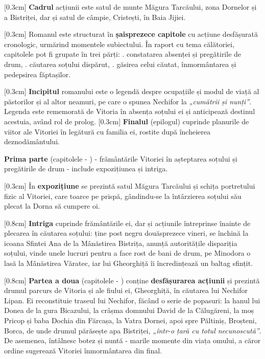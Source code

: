 \documentclass[
12pt,
a4paper
]{article}
\newcommand{\rom}[1]{\uppercase\expandafter{\romannumeral #1\relax}} %
\begin{document}
[0.3cm]
\textbf{Cadrul} acțiunii este satul de munte Măgura Tarcăului, zona Dornelor și a Bistriței, dar și satul de câmpie, Cristești, în Baia Jijiei.

[0.3cm]
Romanul este structurat în \textbf{șaisprezece capitole} cu acțiune desfășurată cronologic, urmărind momentele subiectului. În raport cu tema călătoriei, capitolele pot fi grupate în trei părți: \rom{1}. constatarea absenței și pregătirile de drum, \rom{2}. căutarea soțului dispărut, \rom{3}. găsirea celui căutat, înmormântarea și pedepsirea făptașilor.

[0.3cm]
\textbf{Incipitul} romanului este o legendă despre ocupațiile și modul de viață al păstorilor și al altor neamuri, pe care o spunea Nechifor la \textit{„cumătrii și nunți”}. Legenda este rememorată de Vitoria în absența soțului ei și anticipează destinul acestuia, având rol de prolog.
[0.3cm]
\textbf{Finalul} (epilogul) cuprinde planurile de viitor ale Vitoriei în legătură cu familia ei, rostite după încheierea deznodământului.

\textbf{Prima parte} (capitolele \rom{1} - \rom{6}) - frământările Vitoriei în așteptarea soțului și pregătirile de drum - include expozițiunea și intriga.

[0.3cm]
În \textbf{expozițiune} se prezintă satul Măgura Tarcăului și schița portretului fizic al Vitoriei, care toarce pe prispă, gândindu-se la întârzierea soțului său plecat la Dorna să cumpere oi.

[0.8cm]
\textbf{Intriga} cuprinde frământările ei, dar și acțiunile întreprinse înainte de plecarea în căutarea soțului: ține post negru douăsprezece vineri, se închină la icoana Sfintei Ana de la Mânăstirea Bistrița, anunță autoritățile dispariția soțului, vinde unele lucruri pentru a face rost de bani de drum, pe Minodora o lasă la Mânăstirea Văratec, iar lui Gheorghiță îi încredințează un baltag sfințit.

[0.8cm]
\textbf{Partea a doua} (capitolele \rom{7} - \rom{13}) conține \textbf{desfășurarea acțiunii} și prezintă drumul parcurs de Vitoria și ale fiului ei, Gheorghiță, în căutarea lui Nechifor Lipan. Ei reconstituie traseul lui Nechifor, făcând o serie de popasuri: la hanul lui Donea de la gura Bicazului, la crâșma domnului David de la Călugăreni, la moș Pricop și baba Dochia din Fărcașa, la Vatra Dornei, apoi spre Păltiniș, Broșteni, Borca, de unde drumul părăsește apa Bistriței, \textit{„într-o țară cu totul necunoscută”}. De asemenea, întâlnesc botez și nuntă - marile momente din viața omului, a căror ordine sugerează Vitoriei înmormântarea din final.
\end{document}

